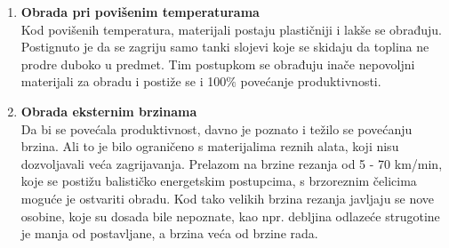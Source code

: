 \documentclass[a4paper,12pt]{article}
\numberwithin{figure}{section}
\begin{document}
\begin{enumerate}
\begin{figure}[!h]
\end{figure}
\FloatBarrier
\item \textbf{Obrada pri povišenim temperaturama}\\
Kod povišenih temperatura, materijali postaju plastičniji i lakše se obrađuju. Postignuto je da se zagriju samo tanki slojevi koje se skidaju da toplina ne prodre duboko u predmet. Tim postupkom se obrađuju inače nepovoljni materijali za obradu i postiže se i 100$\%$ povećanje produktivnosti.
\item \textbf{Obrada eksternim brzinama}\\
Da bi se povećala produktivnost, davno je poznato i težilo se povećanju brzina. Ali to je bilo ograničeno s materijalima reznih alata, koji nisu dozvoljavali veća zagrijavanja. Prelazom na brzine rezanja od 5 - 70 km/min, koje se postižu balističko energetskim postupcima, s brzoreznim čelicima moguće je ostvariti obradu. Kod tako velikih brzina rezanja javljaju se nove osobine, koje su dosada bile nepoznate, kao npr. debljina odlazeće strugotine je manja od postavljane, a brzina veća od brzine rada.
\end{enumerate}
\end{document}
